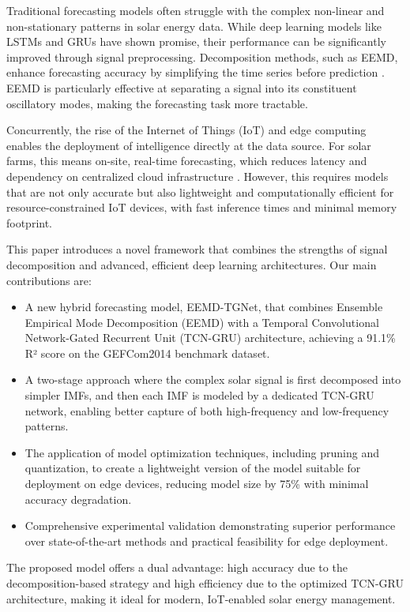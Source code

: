 \documentclass[conference]{IEEEtran}
\begin{document}
Traditional forecasting models often struggle with the complex non-linear and non-stationary patterns in solar energy data. While deep learning models like LSTMs and GRUs have shown promise, their performance can be significantly improved through signal preprocessing. Decomposition methods, such as EEMD, enhance forecasting accuracy by simplifying the time series before prediction \cite{b1}. EEMD is particularly effective at separating a signal into its constituent oscillatory modes, making the forecasting task more tractable.

Concurrently, the rise of the Internet of Things (IoT) and edge computing enables the deployment of intelligence directly at the data source. For solar farms, this means on-site, real-time forecasting, which reduces latency and dependency on centralized cloud infrastructure \cite{b2}. However, this requires models that are not only accurate but also lightweight and computationally efficient for resource-constrained IoT devices, with fast inference times and minimal memory footprint.

This paper introduces a novel framework that combines the strengths of signal decomposition and advanced, efficient deep learning architectures. Our main contributions are:
\begin{itemize}
    \item A new hybrid forecasting model, EEMD-TGNet, that combines Ensemble Empirical Mode Decomposition (EEMD) with a Temporal Convolutional Network-Gated Recurrent Unit (TCN-GRU) architecture, achieving a 91.1\% R² score on the GEFCom2014 benchmark dataset.
    \item A two-stage approach where the complex solar signal is first decomposed into simpler IMFs, and then each IMF is modeled by a dedicated TCN-GRU network, enabling better capture of both high-frequency and low-frequency patterns.
    \item The application of model optimization techniques, including pruning and quantization, to create a lightweight version of the model suitable for deployment on edge devices, reducing model size by 75\% with minimal accuracy degradation.
    \item Comprehensive experimental validation demonstrating superior performance over state-of-the-art methods and practical feasibility for edge deployment.
\end{itemize}

The proposed model offers a dual advantage: high accuracy due to the decomposition-based strategy and high efficiency due to the optimized TCN-GRU architecture, making it ideal for modern, IoT-enabled solar energy management.
\end{document}
